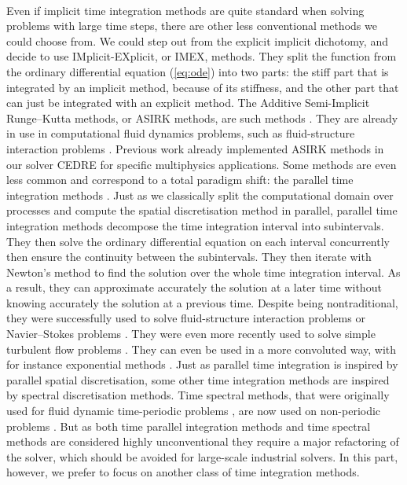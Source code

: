   \paragraph{}
  Even if implicit time integration methods are quite standard when solving problems with large time steps, there are other less conventional methods we could choose from.
  We could step out from the explicit implicit dichotomy, and decide to use IMplicit-EXplicit, or IMEX, methods.
  They split the function from the ordinary differential equation (\ref{eq:ode}) into two parts: the stiff part that is integrated by an implicit method, because of its stiffness, and the other part that can just be integrated with an explicit method.
  The Additive Semi-Implicit Runge--Kutta methods, or ASIRK methods, are such methods \cite{Zhong1996}.
  They are already in use in computational fluid dynamics problems, such as fluid-structure interaction problems \cite{HuangPerssonZahr2019}.
  Previous work already implemented ASIRK methods in our solver CEDRE for specific multiphysics applications.
  Some methods are even less common and correspond to a total paradigm shift: the parallel time integration methods \cite{Nievergelt1964, LionsMadayTurinici2001}.
  Just as we classically split the computational domain over processes and compute the spatial discretisation method in parallel, parallel time integration methods decompose the time integration interval into subintervals.
  They then solve the ordinary differential equation on each interval concurrently then ensure the continuity between the subintervals.
  They then iterate with Newton's method to find the solution over the whole time integration interval.
  As a result, they can approximate accurately the solution at a later time without knowing accurately the solution at a previous time.
  Despite being nontraditional, they were successfully used to solve fluid-structure interaction problems or Navier--Stokes problems \cite{GanderVandewalle2007}.
  They were even more recently used to solve simple turbulent flow problems \cite{Lunet2018}.
  They can even be used in a more convoluted way, with for instance exponential methods \cite{GanderGuettel2013}.
  Just as parallel time integration is inspired by parallel spatial discretisation, some other time integration methods are inspired by spectral discretisation methods.
  Time spectral methods, that were originally used for fluid dynamic time-periodic problems \cite{GopinathJameson2005, GopinathJameson2006}, are now used on non-periodic problems \cite{EkiciDjeddiLiEtAl2020}.
  But as both time parallel integration methods and time spectral methods are considered highly unconventional they require a major refactoring of the solver, which should be avoided for large-scale industrial solvers.
  In this part, however, we prefer to focus on another class of time integration methods.


